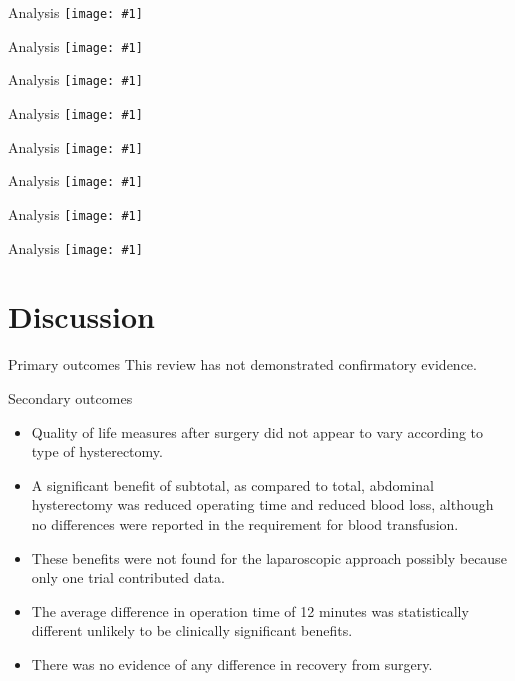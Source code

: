 \documentclass{beamer}
\newcommand*{\solo}[1]{\centering\texttt{[image: \#1]}}
\begin{document}
\begin{frame}{Analysis}
    \solo{A8.eps}
\end{frame}

\begin{frame}{Analysis}
    \solo{A9.eps}
\end{frame}

\begin{frame}{Analysis}
    \solo{A10.eps}
\end{frame}

\begin{frame}{Analysis}
    \solo{A11.eps}
\end{frame}

\begin{frame}{Analysis}
    \solo{A12.eps}
\end{frame}

\begin{frame}{Analysis}
    \solo{A13.eps}
\end{frame}

\begin{frame}{Analysis}
    \solo{A15.eps}
\end{frame}

\begin{frame}{Analysis}
    \solo{A16.eps}
\end{frame}

\section{Discussion}
\begin{frame}{Primary outcomes}
    This review has not demonstrated confirmatory evidence.
\end{frame}

\begin{frame}{Secondary outcomes}
    \begin{itemize}
        \item Quality of life measures after surgery did not appear to vary according to type of hysterectomy.
        \item A significant benefit of subtotal, as compared to total,
              abdominal hysterectomy was reduced operating time and reduced
              blood loss, although no differences were reported in the
              requirement for blood transfusion.
        \item These benefits were not found for the laparoscopic approach possibly because only one trial contributed data.
        \item The average difference in operation time of 12 minutes was
              statistically different unlikely to be clinically significant
              benefits.
        \item There was no evidence of any difference in recovery from surgery.
    \end{itemize}
\end{frame}
\end{document}
